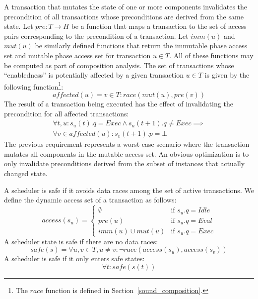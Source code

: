 A transaction that mutates the state of one or more components invalidates the precondition of all transactions whose preconditions are derived from the same state.
Let $\mathit{pre}: T \to H$ be a function that maps a transaction to the set of access pairs corresponding to the precondition of a transaction.
Let $\mathit{imm}(u)$ and $\mathit{mut}(u)$ be similarly defined functions that return the immutable phase access set and mutable phase access set for transaction $u \in T$.
All of these functions may be computed as part of composition analysis.
The set of transactions whose ``enabledness'' is potentially affected by a given transaction $u \in T$ is given by the following function\footnote{The $\mathit{race}$ function is defined in Section~\ref{sound_composition}.}:
\begin{equation}
  \label{affected}
  \mathit{affected}(u) = { v \in T : \mathit{race}(\mathit{mut}(u), \mathit{pre}(v)) }
\end{equation}
The result of a transaction being executed has the effect of invalidating the precondition for all affected transactions:
\begin{multline}
  \forall t, u : s_u(t).q = \mathit{Exec} \land s_u(t+1).q \neq \mathit{Exec} \implies \\ \forall v \in \mathit{affected}(u) : s_v(t+1).p = \bot
\end{multline}
The previous requirement represents a worst case scenario where the transaction mutates all components in the mutable access set.
An obvious optimization is to only invalidate preconditions derived from the subset of instances that actually changed state.

A scheduler is safe if it avoids data races among the set of active transactions.
We define the dynamic access set of a transaction as follows:
\begin{equation}
  \label{access}
  \mathit{access}(s_u) = \begin{cases}
    \emptyset & \text{if $s_u.q = \mathit{Idle}$} \\
    \mathit{pre}(u) & \text{if $s_u.q = \mathit{Eval}$} \\
    \mathit{imm}(u) \cup \mathit{mut}(u) & \text{if $s_u.q = \mathit{Exec}$}
    \end{cases}
\end{equation}
A scheduler state is safe if there are no data races:
\begin{equation}
  \mathit{safe}(s) = \forall u, v \in T, u \neq v : \lnot \mathit{race} (\mathit{access}(s_u), \mathit{access}(s_v))
\end{equation}
A scheduler is safe if it only enters safe states:
\begin{equation}
  \label{race}
  \forall t : \mathit{safe}(s(t))
\end{equation}

